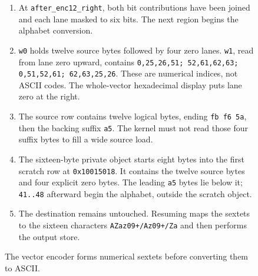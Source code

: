 \begin{figure}[htbp]
  \par\smallskip
  \begin{minipage}{\linewidth}
    \small
    \begin{enumerate}
      \setlength{\itemsep}{0pt}
            \setlength{\parsep}{0pt}
      \item At \texttt{after\_enc12\_right}, both bit contributions have been joined and each lane masked to six bits. The next region begins the alphabet conversion.
      \item \texttt{w0} holds twelve source bytes followed by four zero lanes. \texttt{w1}, read from lane zero upward, contains \texttt{0,25,26,51; 52,61,62,63; 0,51,52,61; 62,63,25,26}. These are numerical indices, not ASCII codes. The whole-vector hexadecimal display puts lane zero at the right.
      \item The source row contains twelve logical bytes, ending \texttt{fb f6 5a}, then the backing suffix \texttt{a5}. The kernel must not read those four suffix bytes to fill a wide source load.
      \item The sixteen-byte private object starts eight bytes into the first scratch row at \texttt{0x10015018}. It contains the twelve source bytes and four explicit zero bytes. The leading \texttt{a5} bytes lie below it; \texttt{41..48} afterward begin the alphabet, outside the scratch object.
      \item The destination remains untouched. Resuming maps the sextets to the sixteen characters \texttt{AZaz09+/Az09+/Za} and then performs the output store.
    \end{enumerate}
  \end{minipage}
  \caption{The vector encoder forms numerical sextets before converting them to ASCII.}
  \label{capture:028-base64-f03}
  \label{base64-f03}
\end{figure}
\par

